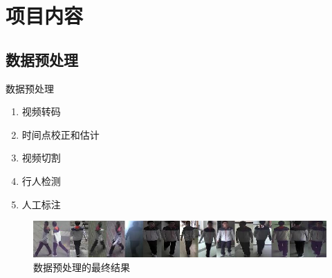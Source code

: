 \section{项目内容}

\subsection{数据预处理}

    \begin{frame}{数据预处理}
    \begin{block}{}
    \begin{enumerate}
        \item 视频转码
        \item 时间点校正和估计
        \item 视频切割
        \item 行人检测
        \item 人工标注
    \end{enumerate}
    \end{block}
    \begin{figure}
    \centering
    \includegraphics[width=\textwidth]{figures/label}
    \caption{数据预处理的最终结果}
    \label{fig:label}
    \end{figure}
    \end{frame}

